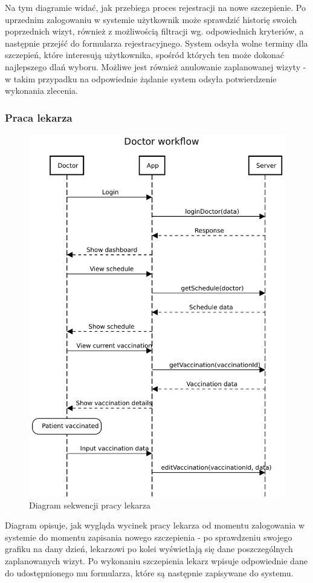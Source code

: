 \documentclass[a4paper,12pt,polish]{article}
\begin{document}
Na tym diagramie widać, jak przebiega proces rejestracji na nowe szczepienie. Po uprzednim zalogowaniu w systemie użytkownik może sprawdzić historię swoich poprzednich wizyt, również z możliwością filtracji wg. odpowiednich kryteriów, a następnie przejść do formularza rejestracyjnego. System odsyła wolne terminy dla szczepień, które interesują użytkownika, spośród których ten może dokonać najlepszego dlań wyboru. Możliwe jest również anulowanie zaplanowanej wizyty - w takim przypadku na odpowiednie żądanie system odsyła potwierdzenie wykonania zlecenia.

\newpage

\subsubsection{Praca lekarza}

\begin{figure}[!htbp]
    \centering
    \includegraphics[width=\textwidth,height=0.7\textheight,keepaspectratio]{Doctor_workflow.pdf} 
    \caption{Diagram sekwencji pracy lekarza
    \label{fig:diagram-uml}}
\end{figure}
Diagram opisuje, jak wygląda wycinek pracy lekarza od momentu zalogowania w systemie do momentu zapisania nowego szczepienia - po sprawdzeniu swojego grafiku na dany dzień, lekarzowi po kolei wyświetlają się dane poszczególnych zaplanowanych wizyt. Po wykonaniu szczepienia lekarz wpisuje odpowiednie dane do udostępnionego mu formularza, które są następnie zapisywane do systemu.
\end{document}
